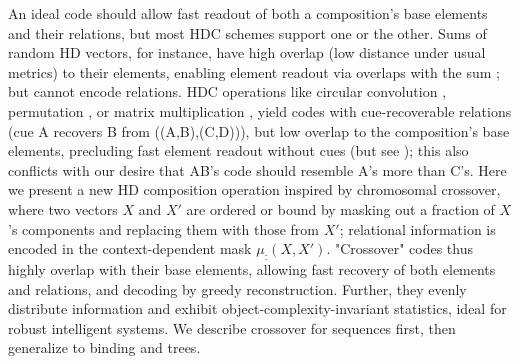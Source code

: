 \documentclass{article}
\begin{document}
An ideal code should allow fast readout of both a composition's base elements and their relations, but most HDC schemes support one or the other. Sums of random HD vectors, for instance, have high overlap (low distance under usual metrics) to their elements, enabling element readout via overlaps with the sum \cite{Bloom:1970, Anderson:1973, Plate:1994}; but cannot encode relations. HDC operations like circular convolution \cite{Plate:1995}, permutation \cite{Gayler:1998, Sahlgren:2008}, or matrix multiplication \cite{Gosmann:2019}, yield codes with cue-recoverable relations (cue A recovers B from ((A,B),(C,D))), but low overlap to the composition's base elements, precluding fast element readout without cues (but see \cite{Rachkovskij:2001}); this also conflicts with our desire that AB's code should resemble A's more than C's. Here we present a new HD composition operation inspired by chromosomal crossover, where two vectors $X$ and $X'$ are ordered or bound by masking out a fraction of $X$'s components and replacing them with those from $X'$; relational information is encoded in the context-dependent mask $\mu_:(X, X')$. "Crossover" codes thus highly overlap with their base elements, allowing fast recovery of both elements and relations, and decoding by greedy reconstruction. Further, they evenly distribute information and exhibit object-complexity-invariant statistics, ideal for robust intelligent systems. We describe crossover for sequences first, then generalize to binding and trees.

\end{document}
